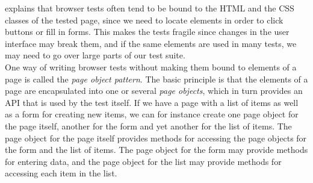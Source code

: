 \citet{web:page_object} explains that browser tests often tend to be
bound to the HTML and the CSS classes of the tested page, since we need
to locate elements in order to click buttons or fill in forms. This
makes the tests fragile since changes in the user interface may break
them, and if the same elements are used in many tests, we may need to go
over large parts of our test suite.\\

One way of writing browser tests without making them bound to elements
of a page is called the \emph{page object pattern}. The basic principle
is that the elements of a page are encapsulated into one or several
\emph{page objects}, which in turn provides an API that is used by the
test itself. If we have a page with a list of items as well as a form
for creating new items, we can for instance create one page object for
the page itself, another for the form and yet another for the list of
items. The page object for the page itself provides methods for
accessing the page objects for the form and the list of items. The page
object for the form may provide methods for entering data, and the page
object for the list may provide methods for accessing each item in the
list. \cite{web:page_object}

